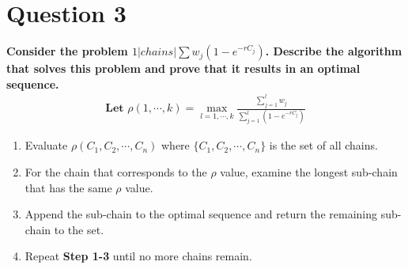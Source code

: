 \documentclass[a4paper, fleqn]{article}
\begin{document}
\section{Question 3}
\textbf{Consider the problem $1|chains|\sum w_j(1-e^{-rC_j})$. Describe the algorithm that solves this problem and prove that it results in an optimal sequence.}
$$
\begin{aligned}
\textbf{Let  }\rho(1,\cdots,k)=\max_{l=1,\cdots,k}\frac{\sum_{j=1}^lw_j}{\sum_{j=1}^l(1-e^{-rC_j})}
\end{aligned}
$$
\begin{enumerate}[label=\textbf{Step \arabic{*}:}]
\item Evaluate $\rho(C_1,C_2,\cdots,C_n)$ where $\{C_1,C_2,\cdots,C_n\}$ is the set of all chains.
\item For the chain that corresponds to the $\rho$ value, examine the longest sub-chain that has the same $\rho$ value.
\item Append the sub-chain to the optimal sequence and return the remaining sub-chain to the set.
\item Repeat \textbf{Step 1-3} until no more chains remain.
\end{enumerate}
\pagebreak
\end{document}
